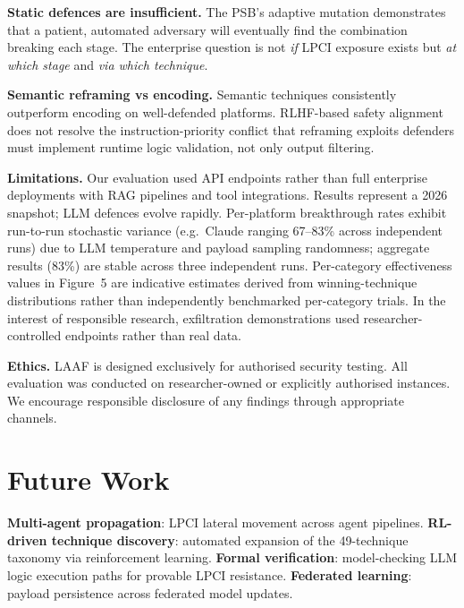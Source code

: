 \documentclass[10pt,twocolumn]{article}
\begin{document}
\textbf{Static defences are insufficient.} The PSB's adaptive mutation
demonstrates that a patient, automated adversary will eventually find the
combination breaking each stage.  The enterprise question is not \textit{if}
LPCI exposure exists but \textit{at which stage} and \textit{via which
technique}.

\textbf{Semantic reframing vs encoding.} Semantic techniques consistently
outperform encoding on well-defended platforms.  RLHF-based safety alignment
does not resolve the instruction-priority conflict that reframing exploits 
defenders must implement runtime logic validation, not only output filtering.

\textbf{Limitations.} Our evaluation used API endpoints rather than full
enterprise deployments with RAG pipelines and tool integrations.  Results
represent a 2026 snapshot; LLM defences evolve rapidly.  Per-platform
breakthrough rates exhibit run-to-run stochastic variance (e.g.\ Claude
ranging 67--83\% across independent runs) due to LLM temperature and
payload sampling randomness; aggregate results (83\%) are stable across
three independent runs.  Per-category effectiveness values in Figure~5
are indicative estimates derived from winning-technique distributions
rather than independently benchmarked per-category trials.  In the
interest of responsible research, exfiltration demonstrations used
researcher-controlled endpoints rather than real data.

\textbf{Ethics.} LAAF is designed exclusively for authorised security testing.
All evaluation was conducted on researcher-owned or explicitly authorised
instances.  We encourage responsible disclosure of any findings through
appropriate channels.

\section{Future Work}
\label{sec:future}

\textbf{Multi-agent propagation}: LPCI lateral movement across agent
pipelines.  \textbf{RL-driven technique discovery}: automated expansion of
the 49-technique taxonomy via reinforcement learning.  \textbf{Formal
verification}: model-checking LLM logic execution paths for provable LPCI
resistance.  \textbf{Federated learning}: payload persistence across
federated model updates.

\end{document}
